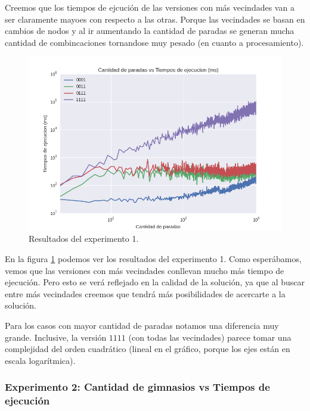 \par Creemos que los tiempos de ejcución de las versiones con más vecindades van a ser claramente mayoes con respecto a las otras. Porque las vecindades se basan en cambios de nodos y al ir aumentando la cantidad de paradas se generan mucha cantidad de combincaciones tornandose muy pesado (en cuanto a procesamiento).

\begin{figure}[H]
  \begin{center}
    \includegraphics[width=\textwidth]{img/ejercicio3/exp1.png}
    \caption{Resultados del experimento 1.}
    \label{fig: ej3_exp1}
  \end{center}
\end{figure}

\par En la figura \ref{fig: ej3_exp1} podemos ver los resultados del experimento 1. Como esperábamos, vemos que las versiones con más vecindades conllevan mucho más tiempo de ejecución. Pero esto se verá reflejado en la calidad de la solución, ya que al buscar entre más vecindades creemos que tendrá más posibilidades de acercarte a la solución.

\par Para los casos con mayor cantidad de paradas notamos una diferencia muy grande. Inclusive, la versión $1111$ (con todas las vecindades) parece tomar una complejidad del orden cuadrático (lineal en el gráfico, porque los ejes están en escala logarítmica).





\subsubsection{Experimento 2: Cantidad de gimnasios vs Tiempos de ejecución}

